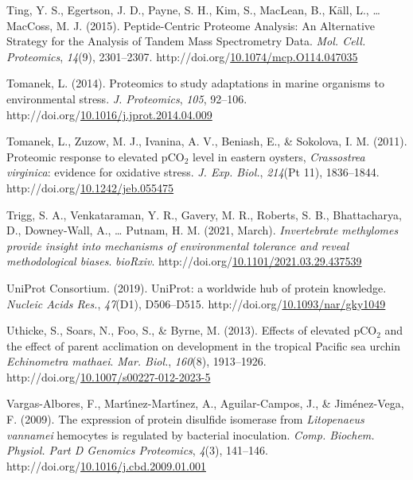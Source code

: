 \documentclass [11pt, proquest] {uwthesis}[2015/03/03]
\newlength{\cslhangindent}
\newenvironment{CSLReferences}%
{\setlength{\parindent}{0pt}%
\everypar{\setlength{\hangindent}{\cslhangindent}}\ignorespaces}%
{\par}
\begin{document}
\begin{CSLReferences}{1}{0}
\leavevmode\hypertarget{ref-Ting2015}{}%
Ting, Y. S., Egertson, J. D., Payne, S. H., Kim, S., MacLean, B., Käll, L., \ldots{} MacCoss, M. J. (2015). {Peptide-Centric Proteome Analysis: An Alternative Strategy for the Analysis of Tandem Mass Spectrometry Data}. \emph{Mol. Cell. Proteomics}, \emph{14}(9), 2301--2307. http://doi.org/\href{https://doi.org/10.1074/mcp.O114.047035}{10.1074/mcp.O114.047035}

\leavevmode\hypertarget{ref-Tomanek2014}{}%
Tomanek, L. (2014). {Proteomics to study adaptations in marine organisms to environmental stress}. \emph{J. Proteomics}, \emph{105}, 92--106. http://doi.org/\href{https://doi.org/10.1016/j.jprot.2014.04.009}{10.1016/j.jprot.2014.04.009}

\leavevmode\hypertarget{ref-Tomanek2011}{}%
Tomanek, L., Zuzow, M. J., Ivanina, A. V., Beniash, E., \& Sokolova, I. M. (2011). {Proteomic response to elevated {pCO\(_2\)} level in eastern oysters, \emph{Crassostrea virginica}: evidence for oxidative stress}. \emph{J. Exp. Biol.}, \emph{214}(Pt 11), 1836--1844. http://doi.org/\href{https://doi.org/10.1242/jeb.055475}{10.1242/jeb.055475}

\leavevmode\hypertarget{ref-Trigg2021}{}%
Trigg, S. A., Venkataraman, Y. R., Gavery, M. R., Roberts, S. B., Bhattacharya, D., Downey-Wall, A., \ldots{} Putnam, H. M. (2021, March). \emph{{Invertebrate methylomes provide insight into mechanisms of environmental tolerance and reveal methodological biases}}. \emph{bioRxiv}. http://doi.org/\href{https://doi.org/10.1101/2021.03.29.437539}{10.1101/2021.03.29.437539}

\leavevmode\hypertarget{ref-UniProt_Consortium2019}{}%
UniProt Consortium. (2019). {UniProt: a worldwide hub of protein knowledge}. \emph{Nucleic Acids Res.}, \emph{47}(D1), D506--D515. http://doi.org/\href{https://doi.org/10.1093/nar/gky1049}{10.1093/nar/gky1049}

\leavevmode\hypertarget{ref-Uthicke2013}{}%
Uthicke, S., Soars, N., Foo, S., \& Byrne, M. (2013). {Effects of elevated {pCO\(_2\)} and the effect of parent acclimation on development in the tropical Pacific sea urchin \emph{Echinometra mathaei}}. \emph{Mar. Biol.}, \emph{160}(8), 1913--1926. http://doi.org/\href{https://doi.org/10.1007/s00227-012-2023-5}{10.1007/s00227-012-2023-5}

\leavevmode\hypertarget{ref-Vargas-Albores2009}{}%
Vargas-Albores, F., Martı́nez-Martı́nez, A., Aguilar-Campos, J., \& Jiménez-Vega, F. (2009). {The expression of protein disulfide isomerase from \emph{Litopenaeus vannamei} hemocytes is regulated by bacterial inoculation}. \emph{Comp. Biochem. Physiol. Part D Genomics Proteomics}, \emph{4}(3), 141--146. http://doi.org/\href{https://doi.org/10.1016/j.cbd.2009.01.001}{10.1016/j.cbd.2009.01.001}


\end{CSLReferences}
\end{document}
